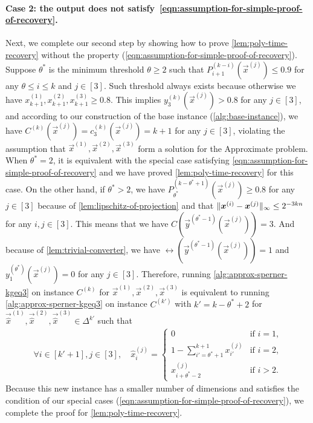 \paragraph{Case 2: the output does not satisfy~\cref{eqn:assumption-for-simple-proof-of-recovery}.}
Next, we complete our second step by showing how to prove \cref{lem:poly-time-recovery} without the property (\cref{eqn:assumption-for-simple-proof-of-recovery}). 
Suppose $\theta^*$ is the minimum threshold $\theta\geq 2$ such that $P_{i+1}^{(k-i)}(\vec{x}^{(j)})\leq 0.9$ for any $\theta\leq i\leq k$ and $j\in[3]$. 
Such threshold always exists because otherwise we have $x^{(1)}_{k+1}, x^{(2)}_{k+1}, x^{(3)}_{k+1}\geq 0.8$. 
This implies $y_3^{(k)}(\vec{x}^{(j)})>0.8$ for any $j\in [3]$, and according to our construction of the base instance (\cref{alg:base-instance}), we have $C^{(k)}(\vec{x}^{(j)})=c^{(k)}_3(\vec{x}^{(j)}) = k+1$ for any $j\in[3]$, violating the assumption that $\vec{x}^{(1)}, \vec{x}^{(2)}, \vec{x}^{(3)}$ form a solution for the \outofk Approximate \Sperner problem. 
When $\theta^*=2$, it is equivalent with the special case satisfying \cref{eqn:assumption-for-simple-proof-of-recovery} and we have proved \cref{lem:poly-time-recovery} for this case.
On the other hand, if $\theta^*>2$, we have $P^{(k-\theta^*+1)}_{\theta^*}(\vec{x}^{(j)})\geq 0.8$ for any $j\in [3]$ because of \cref{lem:lipschitz-of-projection} and that $\| {\boldsymbol{x}^{(i)}-\boldsymbol{x}^{(j)}} \|_{\infty}\leq 2^{-3kn}$ for any $i,j\in [3]$. 
This means that we have $C(\vec{y}^{(\theta^*-1)}(\vec{x}^{(j)}))=3$.
And because of \cref{lem:trivial-converter}, we have $\rel(\vec{y}^{(\theta^*-1)}(\vec{x}^{(j)}))=1$ and $y_1^{(\theta^*)}(\vec{x}^{(j)})=0$ for any $j\in [3]$. 
Therefore, running \cref{alg:approx-sperner-kgeq3} on instance $C^{(k)}$ for $\vec{x}^{(1)},\vec{x}^{(2)}, \vec{x}^{(3)}$ is equivalent to running \cref{alg:approx-sperner-kgeq3} on instance $C^{(k')}$ with $k'=k-\theta^*+2$ for $\vec{\hat{x}}^{(1)},\vec{\hat{x}}^{(2)},\vec{\hat{x}}^{(3)}\in \Delta^{k'}$ such that
\begin{align*}
    \forall i\in [k'+1], j\in [3], \quad \hat{x}_i^{(j)} = \begin{cases}
        0 & \text{if $i=1$,}\\
        1-\sum_{i'=\theta^*+1}^{k+1} x^{(j)}_{i'} & \text{if $i=2$,}\\
        x^{(j)}_{i+\theta^*-2} & \text{if $i>2$.}
    \end{cases}
\end{align*}
Because this new instance has a smaller number of dimensions and satisfies the condition of our special cases (\cref{eqn:assumption-for-simple-proof-of-recovery}), we complete the proof for \cref{lem:poly-time-recovery}.